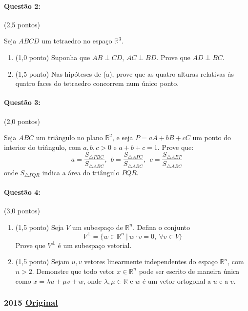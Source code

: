\documentclass[12pt,a4paper]{article}
\newcommand{\original}[1]{\tiny \href{#1}{Original} \normalsize}
\begin{document}
\paragraph{Questão 2:} (2,5 pontos)

Seja $ABCD$ um tetraedro no espaço $\mathbb{R}^3$. 
\begin{enumerate}[label=(\alph*)]
\item (1,0 ponto) Suponha que $AB \perp CD$, $AC \perp BD$. Prove que $AD \perp BC$.
\item (1,5 ponto) Nas hipóteses de (a), prove que as quatro alturas relativas às quatro faces do tetraedro concorrem num único ponto.
\end{enumerate}

\paragraph{Questão 3:} (2,0 pontos)

Seja $ABC$ um triângulo no plano $\mathbb{R}^2$, e seja $P=aA+bB+cC$ um ponto do interior do triângulo, com $a,b,c>0$ e $a+b+c=1$. Prove que:
$$ a= \dfrac{S_{\triangle PBC }}{S_{\triangle ABC}},\ \ b=\dfrac{S_{\triangle APC }}{S_{\triangle ABC}},\ \ c=\dfrac{S_{\triangle ABP }}{S_{\triangle ABC}} $$
 onde $S_{\triangle PQR}$ indica a área do triângulo $PQR$. 
\paragraph{Questão 4:} (3,0 pontos)

\begin{enumerate}[label=(\alph*)]
\item (1,5 ponto) Seja $V$ um subespaço de $\mathbb{R}^n$. Defina o conjunto 
$$V^\perp = \{w \in \mathbb{R}^n \ | \ w \cdot v=0,\ \forall v \in V \} $$
Prove que $V^\perp$ é um subespaço vetorial.
\item (1,5 ponto) Sejam $u,v$ vetores linearmente independentes do espaço $\mathbb{R}^n$, com $n>2$. Demonstre que todo vetor $x \in \mathbb{R}^n$ pode ser escrito de maneira única como $x=\lambda u + \mu v +w$, onde $\lambda, \mu \in \mathbb{R}$ e $w$ é um vetor ortogonal a $u$ e a $v$.
\end{enumerate}

\newpage
\subsubsection{2015 \original{https://drive.google.com/file/d/1tqA1mBCGCLP3JHuWI8D-p2LwVpg7IjHz/view?usp=sharing}}
\end{document}
